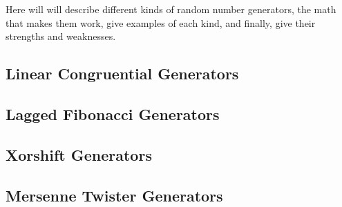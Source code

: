 Here will will describe different kinds of random number generators, the math that makes them work, give examples of each kind, and finally, give their strengths and weaknesses.

\subsection{Linear Congruential Generators}
\label{sec:lcg}


\subsection{Lagged Fibonacci Generators}
\label{sec:laggedfib}


\subsection{Xorshift Generators}
\label{sec:xorshift}


\subsection{Mersenne Twister Generators}
\label{sec:mt}

